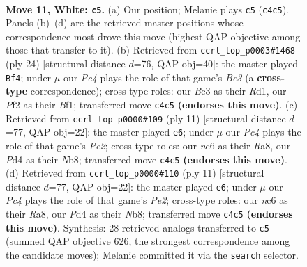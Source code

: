 \documentclass[11pt]{article}
\begin{document}
\clearpage

\begin{figure}[p]\centering
\begin{subfigure}{0.46\textwidth}\centering
\resizebox{\linewidth}{!}{%
\newchessgame
\chessboard[
  setfen={r1b2rk1/ppppqpp1/2n1pn2/7p/Q1PP4/2B2NP1/PP2PP1P/R3KB1R w - - 6 11},
  showmover=false,
  pgfstyle=straightmove, color=movearrow, markmove={c4-c5}
]}
\caption{}
\end{subfigure}\hfill
\begin{subfigure}{0.46\textwidth}\centering
\resizebox{\linewidth}{!}{%
\newchessgame
\chessboard[
  setfen={r4rk1/ppp1qppp/2nnb3/3p4/3P4/PQ2B3/1PP1NPPP/2KR1B1R w - - 7 13},
  showmover=false,
  pgfstyle=straightmove, color=movearrow, markmove={e3-f4}
]}
\caption{}
\end{subfigure}
\\[4pt]
\begin{subfigure}{0.46\textwidth}\centering
\resizebox{\linewidth}{!}{%
\newchessgame
\chessboard[
  setfen={rn1qkb1r/pp2pppp/2p2n2/5b2/P1pP4/2N1PN2/1P3PPP/R1BQKB1R b KQkq - 0 6},
  showmover=false,
  pgfstyle=straightmove, color=movearrow, markmove={e7-e6}
]}
\caption{}
\end{subfigure}\hfill
\begin{subfigure}{0.46\textwidth}\centering
\resizebox{\linewidth}{!}{%
\newchessgame
\chessboard[
  setfen={rn1qkb1r/pp2pppp/2p2n2/5b2/P1pP4/2N1PN2/1P3PPP/R1BQKB1R b KQkq - 0 6},
  showmover=false,
  pgfstyle=straightmove, color=movearrow, markmove={e7-e6}
]}
\caption{}
\end{subfigure}
\caption{\textbf{Move 11, White: \texttt{c5}.} (a) Our position; Melanie plays \texttt{c5} (\texttt{c4c5}). Panels (b)--(d) are the retrieved master positions whose correspondence most drove this move (highest QAP objective among those that transfer to it). (b) Retrieved from \texttt{ccrl\_top\_p0003\#1468} (ply 24) [structural distance $d$=76, QAP obj=40]: the master played \texttt{Bf4}; under $\mu$ our \emph{Pc4} plays the role of that game's \emph{Be3} (a \textbf{cross-type} correspondence); cross-type roles: our \emph{B}c3 as their \emph{R}d1, our \emph{P}f2 as their \emph{B}f1; transferred move \texttt{c4c5} \textbf{(endorses this move)}. (c) Retrieved from \texttt{ccrl\_top\_p0000\#109} (ply 11) [structural distance $d$=77, QAP obj=22]: the master played \texttt{e6}; under $\mu$ our \emph{Pc4} plays the role of that game's \emph{Pe2}; cross-type roles: our \emph{n}c6 as their \emph{R}a8, our \emph{P}d4 as their \emph{N}b8; transferred move \texttt{c4c5} \textbf{(endorses this move)}. (d) Retrieved from \texttt{ccrl\_top\_p0000\#110} (ply 11) [structural distance $d$=77, QAP obj=22]: the master played \texttt{e6}; under $\mu$ our \emph{Pc4} plays the role of that game's \emph{Pe2}; cross-type roles: our \emph{n}c6 as their \emph{R}a8, our \emph{P}d4 as their \emph{N}b8; transferred move \texttt{c4c5} \textbf{(endorses this move)}. Synthesis: 28 retrieved analogs transferred to \texttt{c5} (summed QAP objective 626, the strongest correspondence among the candidate moves); Melanie committed it via the \texttt{search} selector.}
\label{fig:thought-m20}
\end{figure}
\end{document}
